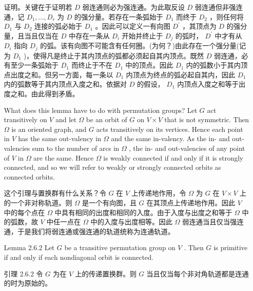 \documentclass[10pt]{article}
\begin{document}
\begin{tcolorbox}\relax
证明。关键在于证明若 \(D\) 弱连通则必为强连通。为此取反设 \(D\) 弱连通但非强连通，记 \({D}_{1},\ldots ,{D}_{r}\) 为 \(D\) 的强分量。若存在一条弧始于 \({D}_{1}\) 而终于 \({D}_{2}\) ，则任何将 \({D}_{1}\) 与 \({D}_{2}\) 连接的弧必始于 \({D}_{1}\) 。因此可以定义一有向图 \({D}^{\prime }\) ，其顶点为 \(D\) 的强分量，且当且仅当在 \(D\) 中存在一条从 \({D}_{i}\) 开始并终止于 \({D}_{j}\) 的弧时， \({D}^{\prime }\) 中才有从 \({D}_{i}\) 指向 \({D}_{j}\) 的弧。该有向图不可能含有任何圈。(为何？)由此存在一个强分量(记为 \({D}_{1}\) )，使得凡是终止于其内顶点的弧都必须起自其内顶点。既然 \(D\) 弱连通，必有至少一条弧始于 \({D}_{1}\) 而终止于不在 \({D}_{1}\) 中的顶点。因此 \({D}_{1}\) 内的弧数小于其内顶点出度之和。但另一方面，每一条以 \({D}_{1}\) 内顶点为终点的弧必起自其内，因此 \({D}_{1}\) 内的弧数等于其内顶点入度之和。依据对 \(D\) 的假设， \({D}_{1}\) 内顶点入度之和等于出度之和。由此得到矛盾。
\end{tcolorbox}

What does this lemma have to do with permutation groups? Let \(G\) act transitively on \(V\) and let \(\Omega\) be an orbit of \(G\) on \(V \times  V\) that is not symmetric. Then \(\Omega\) is an oriented graph, and \(G\) acts transitively on its vertices. Hence each point in \(V\) has the same out-valency in \(\Omega\) and the same in-valency. As the in- and out-valencies sum to the number of arcs in \(\Omega\) , the in- and out-valencies of any point of \(V\) in \(\Omega\) are the same. Hence \(\Omega\) is weakly connected if and only if it is strongly connected, and so we will refer to weakly or strongly connected orbits as connected orbits.

\begin{tcolorbox}\relax
这个引理与置换群有什么关系？令 \(G\) 在 \(V\) 上传递地作用，令 \(\Omega\) 为 \(G\) 在 \(V \times  V\) 上的一个非对称轨道。则 \(\Omega\) 是一个有向图，且 \(G\) 在其顶点上传递地作用。因此 \(V\) 中的每个点在 \(\Omega\) 中具有相同的出度和相同的入度。由于入度与出度之和等于 \(\Omega\) 中的弧数，故 \(V\) 中任一点在 \(\Omega\) 中的入度与出度相等。因此 \(\Omega\) 弱连通当且仅当强连通，于是我们将弱连通或强连通的轨道统称为连通轨道。
\end{tcolorbox}

Lemma 2.6.2 Let \(G\) be a transitive permutation group on \(V\) . Then \(G\) is primitive if and only if each nondiagonal orbit is connected.

\begin{tcolorbox}\relax
引理 2.6.2 令 \(G\) 为在 \(V\) 上的传递置换群。则 \(G\) 当且仅当每个非对角轨道都是连通的时为原始的。
\end{tcolorbox}
\end{document}
